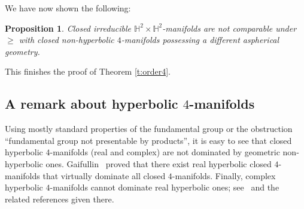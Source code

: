\documentclass[12pt]{amsart}
\newtheorem{prop}[thm]{Proposition}
\theoremstyle{remark}
\begin{document}
We have now shown the following:

\begin{prop}
 Closed irreducible $\mathbb{H}^2 \times \mathbb{H}^2$-manifolds are not comparable under $\geq $ with closed non-hyperbolic $4$-manifolds possessing a
different aspherical geometry.
\end{prop}

This finishes the proof of Theorem \ref{t:order4}.

\subsection{A remark about hyperbolic $4$-manifolds}\label{ss:hyper}
 Using mostly standard properties of the fundamental group or the obstruction ``fundamental group not presentable by products'', it is easy to see that
closed hyperbolic $4$-manifolds (real and complex) are not dominated by geometric non-hyperbolic ones. Gaifullin~\cite{Gaifullin} proved that there exist
real hyperbolic closed $4$-manifolds that virtually dominate all closed $4$-manifolds. Finally, complex hyperbolic $4$-manifolds cannot
dominate real hyperbolic ones; see~\cite{CarlsonToledo} and the related references given there. 


\end{document}
